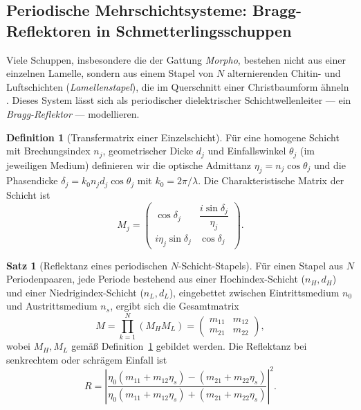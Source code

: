 ﻿\documentclass[a4paper,12pt]{article}
\theoremstyle{definition}
\newtheorem{definition}{Definition}
\newtheorem{satz}{Satz}
\begin{document}
\subsection{Periodische Mehrschichtsysteme: Bragg-Reflektoren in Schmetterlingsschuppen}
\label{sec:bragg}

Viele Schuppen, insbesondere die der Gattung \textit{Morpho}, bestehen nicht
aus einer einzelnen Lamelle, sondern aus einem Stapel von $N$ alternierenden
Chitin- und Luftschichten (\textit{Lamellenstapel}), die im
Querschnitt einer Christbaumform ähneln \cite{vukusic2003photonic}.
Dieses System lässt sich als periodischer dielektrischer
Schichtwellenleiter --- ein \emph{Bragg-Reflektor} --- modellieren.

\begin{definition}[Transfermatrix einer Einzelschicht]
	\label{def:transfermatrix}
	Für eine homogene Schicht mit Brechungsindex $n_j$, geometrischer Dicke
	$d_j$ und Einfallswinkel $\theta_j$ (im jeweiligen Medium) definieren wir
	die optische Admittanz $\eta_j = n_j \cos\theta_j$ und die
	Phasendicke $\delta_j = k_0 n_j d_j \cos\theta_j$ mit
	$k_0 = 2\pi/\lambda$. Die Charakteristische Matrix der Schicht ist
	\[
	M_j = \begin{pmatrix}
		\cos\delta_j & \dfrac{i \sin\delta_j}{\eta_j}\\[1.2ex]
		i \eta_j \sin\delta_j & \cos\delta_j
	\end{pmatrix}.
	\]
\end{definition}

\begin{satz}[Reflektanz eines periodischen $N$-Schicht-Stapels]
	\label{satz:bragg}
	Für einen Stapel aus $N$ Periodenpaaren, jede Periode bestehend aus
	einer Hochindex-Schicht ($n_H, d_H$) und einer Niedrigindex-Schicht
	($n_L, d_L$), eingebettet zwischen Eintrittsmedium $n_0$ und
	Austrittsmedium $n_s$, ergibt sich die Gesamtmatrix
	\[
	M = \prod_{k=1}^{N} \left(M_H M_L\right) =
	\begin{pmatrix} m_{11} & m_{12}\\ m_{21} & m_{22}\end{pmatrix},
	\]
	wobei $M_H, M_L$ gemäß Definition~\ref{def:transfermatrix} gebildet
	werden. Die Reflektanz bei senkrechtem oder schrägem Einfall ist
	\[
	R = \left|\frac{\eta_0(m_{11}+m_{12}\eta_s) - (m_{21}+m_{22}\eta_s)}
	{\eta_0(m_{11}+m_{12}\eta_s) + (m_{21}+m_{22}\eta_s)}\right|^2.
	\]
\end{satz}
\end{document}
